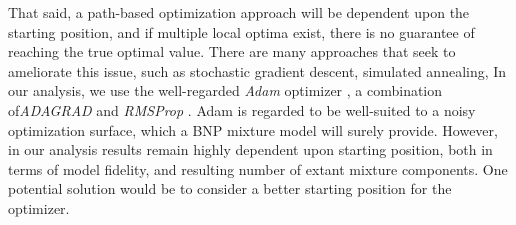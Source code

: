 That said, a path-based optimization approach will be dependent upon the starting position,
    and if multiple local optima exist, there is no guarantee of reaching the
    true optimal value.  There are many approaches that seek to ameliorate this issue,
    such as stochastic gradient descent, simulated annealing, 
    In our analysis, we use the well-regarded \emph{Adam} optimizer \citep{kingma2017}, 
    a combination of\emph{ADAGRAD} \citep{duchi2011} and \emph{RMSProp} \citep{tieleman2012}.
    Adam is regarded to be well-suited to a noisy optimization surface, which a BNP
    mixture model will surely provide.  However, in our analysis results remain highly 
    dependent upon starting position, both in terms of model fidelity, and resulting 
    number of extant mixture components.  One potential solution would be to 
    consider a better starting position for the optimizer.



